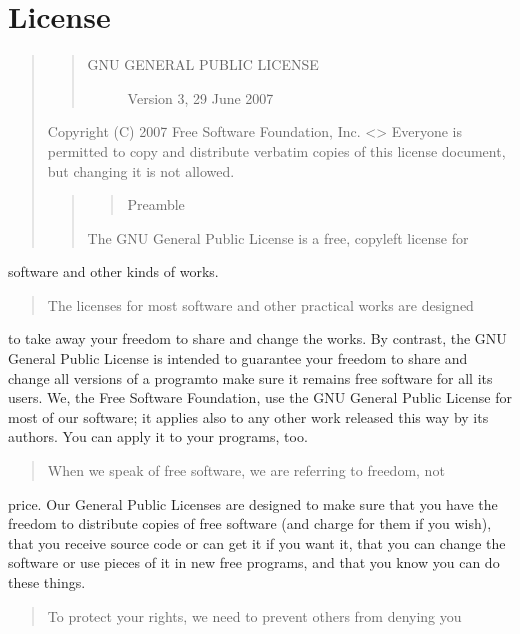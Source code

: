 \documentclass[letterpaper,10pt,english]{sphinxmanual}
\begin{document}
\chapter{License}
\label{\detokenize{license:license}}\label{\detokenize{license::doc}}\begin{quote}
\begin{quote}
\begin{description}
\item[{GNU GENERAL PUBLIC LICENSE}] \leavevmode
Version 3, 29 June 2007

\end{description}
\end{quote}

Copyright (C) 2007 Free Software Foundation, Inc. \textless{}\textgreater{}
Everyone is permitted to copy and distribute verbatim copies
of this license document, but changing it is not allowed.
\begin{quote}
\begin{quote}

Preamble
\end{quote}

The GNU General Public License is a free, copyleft license for
\end{quote}
\end{quote}

software and other kinds of works.
\begin{quote}

The licenses for most software and other practical works are designed
\end{quote}

to take away your freedom to share and change the works.  By contrast,
the GNU General Public License is intended to guarantee your freedom to
share and change all versions of a program\textendash{}to make sure it remains free
software for all its users.  We, the Free Software Foundation, use the
GNU General Public License for most of our software; it applies also to
any other work released this way by its authors.  You can apply it to
your programs, too.
\begin{quote}

When we speak of free software, we are referring to freedom, not
\end{quote}

price.  Our General Public Licenses are designed to make sure that you
have the freedom to distribute copies of free software (and charge for
them if you wish), that you receive source code or can get it if you
want it, that you can change the software or use pieces of it in new
free programs, and that you know you can do these things.
\begin{quote}

To protect your rights, we need to prevent others from denying you
\end{quote}
\end{document}
